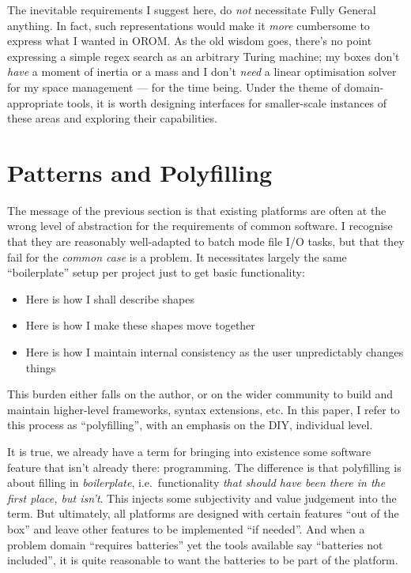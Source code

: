 The inevitable requirements I suggest here, do \emph{not} necessitate
Fully General anything. In fact, such representations would make it
\emph{more} cumbersome to express what I wanted in OROM. As the old
wisdom goes, there's no point expressing a simple regex search as an
arbitrary Turing machine; my boxes don't \emph{have} a moment of inertia
or a mass and I don't \emph{need} a linear optimisation solver for my
space management --- for the time being. Under the theme of
domain-appropriate tools, it is worth designing interfaces for
smaller-scale instances of these areas and exploring their capabilities.

\hypertarget{patterns-and-polyfilling}{%
\section{Patterns and Polyfilling}\label{patterns-and-polyfilling}}

The message of the previous section is that existing platforms are often
at the wrong level of abstraction for the requirements of common
software. I recognise that they are reasonably well-adapted to batch
mode file I/O tasks, but that they fail for the \emph{common case} is a
problem. It necessitates largely the same ``boilerplate'' setup per
project just to get basic functionality:

\begin{itemize}
\tightlist
\item
  Here is how I shall describe shapes
\item
  Here is how I make these shapes move together
\item
  Here is how I maintain internal consistency as the user unpredictably
  changes things
\end{itemize}

This burden either falls on the author, or on the wider community to
build and maintain higher-level frameworks, syntax extensions, etc. In
this paper, I refer to this process as ``polyfilling'', with an emphasis
on the DIY, individual level.

It is true, we already have a term for bringing into existence some
software feature that isn't already there: programming. The difference
is that polyfilling is about filling in \emph{boilerplate},
i.e.~functionality \emph{that should have been there in the first place,
but isn't}. This injects some subjectivity and value judgement into the
term. But ultimately, all platforms are designed with certain features
``out of the box'' and leave other features to be implemented ``if
needed''. And when a problem domain ``requires batteries'' yet the tools
available say ``batteries not included'', it is quite reasonable to want
the batteries to be part of the platform.

